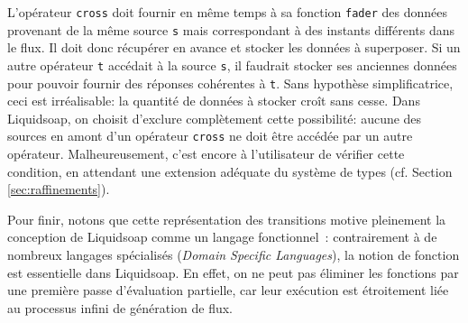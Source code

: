 \documentclass[twoside]{article}
\newcommand{\liquidsoap}{Liquidsoap}
\theoremstyle{plain}
\theoremstyle{definition}
\theoremstyle{remark}
\begin{document}
L'opérateur \verb.cross. doit fournir en même temps
à sa fonction \verb.fader. des données provenant de la même source \verb.s. 
mais correspondant à des instants différents dans le flux.
Il doit donc récupérer en avance et stocker les données à superposer.
Si un autre opérateur \verb.t. accédait à la source \verb.s., il 
faudrait stocker ses anciennes données pour pouvoir fournir des 
réponses cohérentes à \verb.t.. Sans hypothèse simplificatrice, ceci est 
irréalisable: la quantité de données à stocker croît sans cesse.
Dans \liquidsoap, on choisit d'exclure complètement cette possibilité:
aucune des sources en amont d'un opérateur \verb.cross. ne doit
être accédée par un autre opérateur.
Malheureusement,
c'est encore à l'utilisateur de vérifier cette condition,
en attendant une extension adéquate du système de types (cf. Section 
\ref{sec:raffinements}).

Pour finir, notons que cette représentation des transitions motive pleinement
la conception de \liquidsoap{} comme un langage fonctionnel~: contrairement à de
nombreux langages spécialisés (\emph{Domain Specific Languages}), la notion de
fonction est essentielle dans \liquidsoap{}. En effet, on ne peut pas éliminer 
les fonctions par une première passe d'évaluation partielle, car leur 
exécution est étroitement liée au processus infini de génération de flux.
\end{document}
